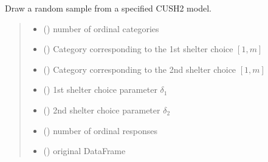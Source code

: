 \documentclass[letterpaper,10pt,english]{sphinxmanual}
\begin{document}
\begin{fulllineitems}
\label{\detokenize{cubmods:cubmods.cush2.draw}}
\pysigstartsignatures
{}
\pysigstopsignatures
\sphinxAtStartPar
Draw a random sample from a specified CUSH2 model.
\begin{quote}\begin{description}
\begin{itemize}
\item {} 
\sphinxAtStartPar
{} () \textendash{} number of ordinal categories

\item {} 
\sphinxAtStartPar
{} () \textendash{} Category corresponding to the 1st shelter choice \([1,m]\)

\item {} 
\sphinxAtStartPar
{} () \textendash{} Category corresponding to the 2nd shelter choice \([1,m]\)

\item {} 
\sphinxAtStartPar
{} () \textendash{} 1st shelter choice parameter \(\delta_1\)

\item {} 
\sphinxAtStartPar
{} () \textendash{} 2nd shelter choice parameter \(\delta_2\)

\item {} 
\sphinxAtStartPar
{} () \textendash{} number of ordinal responses

\item {} 
\sphinxAtStartPar
{} () \textendash{} original DataFrame


\end{itemize}
\end{description}
\end{quote}
\end{fulllineitems}
\end{document}
